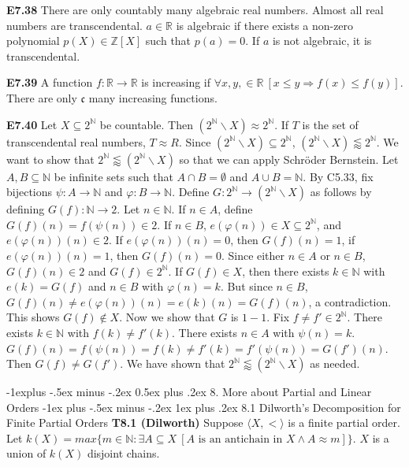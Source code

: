 \documentclass[10pt, landscape]{article}
\makeatletter
\renewcommand{\section}{\@startsection{section}{1}{0mm}%
                                {-1ex plus -.5ex minus -.2ex}%
                                {0.5ex plus .2ex}%
                                {\normalfont\large\bfseries}}
\renewcommand{\section}{\@startsection{section}{2}{0mm}%
                                {-1explus -.5ex minus -.2ex}%
                                {0.5ex plus .2ex}%
                                {\normalfont\normalsize\bfseries}}
\renewcommand{\subsection}{\@startsection{subsection}{3}{0mm}%
                                {-1ex plus -.5ex minus -.2ex}%
                                {1ex plus .2ex}%
                                {\normalfont\small\bfseries}}%
\makeatother
\begin{document}
\begin{multicols*}{3}
\textbf{E7.38} There are only countably many algebraic real numbers. Almost all real numbers are transcendental. $a \in \mathbb{R}$ is algebraic if there exists a non-zero polynomial $p(X) \in \mathbb{Z}[X]$ such that $p(a)=0$. If $a$ is not algebraic, it is transcendental.

\textbf{E7.39} A function $f : \mathbb{R} \rightarrow \mathbb{R}$ is increasing if $\forall x, y, \in \mathbb{R} \ [x \leq y \Rightarrow f(x) \leq f(y)]$. There are only $\mathfrak{c}$ many increasing functions.

\textbf{E7.40} Let $X \subseteq 2^\mathbb{N}$ be countable. Then $(2^\mathbb{N} \backslash X) \approx 2^\mathbb{N}$. If $T$ is the set of transcendental real numbers, $T \approx R$. Since $(2^\mathbb{N} \backslash X) \subseteq 2^\mathbb{N}$, $(2^\mathbb{N} \backslash X) \lessapprox 2^\mathbb{N}$. We want to show that $2^\mathbb{N} \lessapprox (2^\mathbb{N} \backslash X)$ so that we can apply Schröder Bernstein. Let $A, B \subseteq \mathbb{N}$ be infinite sets such that $A \cap B = \emptyset$ and $A \cup B = \mathbb{N}$. By C5.33, fix bijections $\psi : A \rightarrow \mathbb{N}$ and $\varphi : B \rightarrow \mathbb{N}$. Define $G:2^\mathbb{N} \rightarrow (2^\mathbb{N} \backslash X)$ as follows by defining $G(f): \mathbb{N} \rightarrow 2$. Let $n \in \mathbb{N}$. If $n \in A$, define $G(f)(n)=f(\psi(n))\in 2$. If $n \in B$, $e(\varphi(n))\in X \subseteq 2^\mathbb{N}$, and $e(\varphi(n))(n)\in 2$. If $e(\varphi(n))(n)=0$, then $G(f)(n)=1$, if $e(\varphi(n))(n)=1$, then $G(f)(n)=0$. Since either $n \in A$ or $n \in B$, $G(f)(n)\in2$ and $G(f) \in 2^\mathbb{N}$. If $G(f) \in X$, then there exists $k \in \mathbb{N}$ with $e(k)=G(f)$ and $n \in B$ with $\varphi(n)=k$. But since $n \in B$, $G(f)(n) \neq e(\varphi(n))(n)=e(k)(n)=G(f)(n)$, a contradiction. This shows $G(f) \notin X$. Now we show that $G$ is $1-1$. Fix $f \neq f' \in 2^\mathbb{N}$. There exists $k \in \mathbb{N}$ with $f(k) \neq f'(k)$. There exists $n \in A$ with $\psi(n)=k$. $G(f)(n)=f(\psi(n))=f(k)\neq f'(k) =f'(\psi(n))=G(f')(n)$. Then $G(f)\neq G(f')$. We have shown that $2^\mathbb{N} \lessapprox (2^\mathbb{N}\backslash X)$ as needed.

\section{8. More about Partial and Linear Orders}
\subsection{8.1 Dilworth's Decomposition for Finite Partial Orders}
\textbf{T8.1 (Dilworth)} Suppose $\langle X, < \rangle$ is a finite partial order. Let $k(X)=max\{m \in \mathbb{N}:\exists A \subseteq X\ [A \text{ is an antichain in } X\land A \approx m]\}$. $X$ is a union of $k(X)$ disjoint chains.


\end{multicols*}
\end{document}
